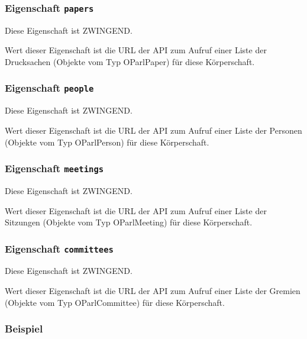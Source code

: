 \documentclass[,a4paper]{article}
\begin{document}
\subsubsection{Eigenschaft \texttt{papers}}

Diese Eigenschaft ist ZWINGEND.

Wert dieser Eigenschaft ist die URL der API zum Aufruf einer Liste der
Drucksachen (Objekte vom Typ OParlPaper) für diese Körperschaft.

\subsubsection{Eigenschaft \texttt{people}}

Diese Eigenschaft ist ZWINGEND.

Wert dieser Eigenschaft ist die URL der API zum Aufruf einer Liste der
Personen (Objekte vom Typ OParlPerson) für diese Körperschaft.

\subsubsection{Eigenschaft \texttt{meetings}}

Diese Eigenschaft ist ZWINGEND.

Wert dieser Eigenschaft ist die URL der API zum Aufruf einer Liste der
Sitzungen (Objekte vom Typ OParlMeeting) für diese Körperschaft.

\subsubsection{Eigenschaft \texttt{committees}}

Diese Eigenschaft ist ZWINGEND.

Wert dieser Eigenschaft ist die URL der API zum Aufruf einer Liste der
Gremien (Objekte vom Typ OParlCommittee) für diese Körperschaft.

\subsubsection{Beispiel}
\end{document}
